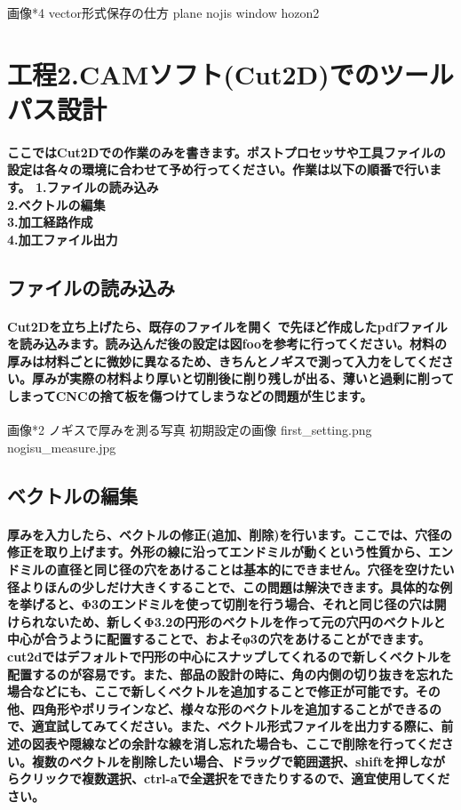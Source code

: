 \documentclass[b5paper, 9pt, twocolumn, titlepage,openany]{jsbook}%
\begin{document}
画像*4 vector形式保存の仕方 plane nojis window hozon2

\section{工程2.CAMソフト(Cut2D)でのツールパス設計}
\paragraph{ここではCut2Dでの作業のみを書きます。ポストプロセッサや工具ファイルの設定は各々の環境に合わせて予め行ってください。作業は以下の順番で行います。
1.ファイルの読み込み\\
2.ベクトルの編集\\
3.加工経路作成\\
4.加工ファイル出力}

\subsection{ファイルの読み込み}
\paragraph{Cut2Dを立ち上げたら、既存のファイルを開く で先ほど作成したpdfファイルを読み込みます。読み込んだ後の設定は図fooを参考に行ってください。材料の厚みは材料ごとに微妙に異なるため、きちんとノギスで測って入力をしてください。厚みが実際の材料より厚いと切削後に削り残しが出る、薄いと過剰に削ってしまってCNCの捨て板を傷つけてしまうなどの問題が生じます。}

画像*2 ノギスで厚みを測る写真 初期設定の画像 first_setting.png nogisu_measure.jpg

\subsection{ベクトルの編集}

\paragraph{厚みを入力したら、ベクトルの修正(追加、削除)を行います。ここでは、穴径の修正を取り上げます。外形の線に沿ってエンドミルが動くという性質から、エンドミルの直径と同じ径の穴をあけることは基本的にできません。穴径を空けたい径よりほんの少しだけ大きくすることで、この問題は解決できます。具体的な例を挙げると、Φ3のエンドミルを使って切削を行う場合、それと同じ径の穴は開けられないため、新しくΦ3.2の円形のベクトルを作って元の穴円のベクトルと中心が合うように配置することで、およそφ3の穴をあけることができます。cut2dではデフォルトで円形の中心にスナップしてくれるので新しくベクトルを配置するのが容易です。また、部品の設計の時に、角の内側の切り抜きを忘れた場合などにも、ここで新しくベクトルを追加することで修正が可能です。その他、四角形やポリラインなど、様々な形のベクトルを追加することができるので、適宜試してみてください。また、ベクトル形式ファイルを出力する際に、前述の図表や隠線などの余計な線を消し忘れた場合も、ここで削除を行ってください。複数のベクトルを削除したい場合、ドラッグで範囲選択、shiftを押しながらクリックで複数選択、ctrl-aで全選択をできたりするので、適宜使用してください。}
\end{document}
